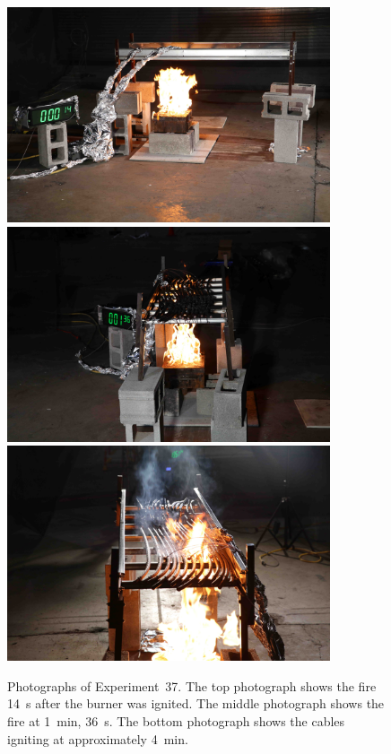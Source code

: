\begin{figure}[p]
\centering
\includegraphics[height=2.50in]{../FIGURES/Test_37_side} \\ \vspace{0.1in}
\includegraphics[height=2.50in]{../FIGURES/Test_37_1_min_36_s} \\ \vspace{0.1in}
\includegraphics[height=2.50in]{../FIGURES/Test_37_ignition}
\caption[Photographs of Experiment~37]{Photographs of Experiment~37. The top photograph shows the fire 14~s after the burner was ignited. The middle photograph shows the fire at 1~min, 36~s. The bottom photograph shows the cables igniting at approximately 4~min.}
\label{fig:Test_37_photos}
\end{figure}


